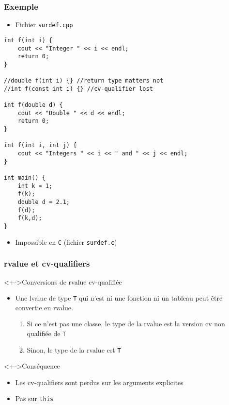 \begin{frame}[containsverbatim]
\frametitle{Exemple}
\begin{itemize}
\item Fichier \texttt{surdef.cpp}
\end{itemize}
\begin{lstlisting}
int f(int i) {
	cout << "Integer " << i << endl; 
	return 0;
}

//double f(int i) {} //return type matters not
//int f(const int i) {} //cv-qualifier lost

int f(double d) {
	cout << "Double " << d << endl;
	return 0;
}

int f(int i, int j) {
	cout << "Integers " << i << " and " << j << endl;
}

int main() {
	int k = 1;
	f(k);
	double d = 2.1;
	f(d);
	f(k,d);
}
\end{lstlisting}
\begin{itemize}
\item Impossible en \texttt{C} (fichier \texttt{surdef.c})
\end{itemize}
\end{frame}

\begin{frame}
\frametitle{rvalue et cv-qualifiers}
\begin{exampleblock}<+->{Conversions de rvalue cv-qualifiée}
	\begin{itemize}[<+->]
	\item Une lvalue de type \texttt{T} qui n'est ni une fonction ni un tableau peut être convertie en rvalue.
		\begin{enumerate}
		\item Si ce n'est pas une classe, le type de la rvalue est la version cv non qualifiée de \texttt{T}
		\item Sinon, le type de la rvalue est \texttt{T}
		\end{enumerate}
	\end{itemize}
\end{exampleblock}
\begin{alertblock}<+->{Conséquence}
	\begin{itemize}[<+->]
	\item Les cv-qualifiers sont perdus sur les arguments explicites
	\item Pas sur \lstinline|this|
	\end{itemize}
\end{alertblock}
\end{frame}

